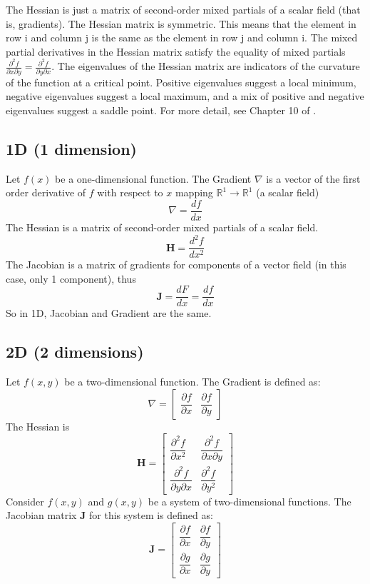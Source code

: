 \documentclass[11pt,a4paper]{book}
\theoremstyle{definition}\newtheorem{definition}{Definition}
\theoremstyle{definition}\newtheorem{fact}{Fact}
\theoremstyle{definition}\newtheorem{remark}{Remark}
\theoremstyle{definition}\newtheorem{ex}{Ex.}
\theoremstyle{definition}\newtheorem{project}{Project}
\theoremstyle{definition}\newtheorem{problem}{Problem}
\theoremstyle{definition}\newtheorem{example}{Example}
\numberwithin{theorem}{section}
\numberwithin{corollary}{chapter}
\numberwithin{assumption}{chapter}
\numberwithin{definition}{chapter}
\numberwithin{prop}{chapter}
\numberwithin{notation}{chapter}
\numberwithin{problem}{chapter}
\numberwithin{example}{chapter}
\numberwithin{fact}{chapter}
\numberwithin{ex}{chapter}
\def\R{\mathbb R}
\def\R{\mathbb R}
\def\H{\mathbf H}
\begin{document}
\begin{appendices}
	The Hessian is just a matrix of second-order mixed partials of a scalar field (that is, gradients). The Hessian matrix is symmetric. This means that the element in row 
	i and column 
	j is the same as the element in row 
	j and column 
	i.
	The mixed partial derivatives in the Hessian matrix satisfy the equality of mixed partials $\frac{\partial^2 f}{\partial x \partial y} = \frac{\partial^2 f}{\partial y\partial x}$. The eigenvalues of the Hessian matrix are indicators of the curvature of the function at a critical point. Positive eigenvalues suggest a local minimum, negative eigenvalues suggest a local maximum, and a mix of positive and negative eigenvalues suggest a saddle point. For more detail, see Chapter 10 of \citet{springcamp}.
	
	\subsection*{1D (1 dimension)}
	Let \( f(x) \) be a one-dimensional function. The Gradient \( \nabla \) is a vector of the first order derivative of \( f \) with respect to \( x \) mapping $\R^1 \to \R^1$ (a scalar field)
	\[
	\nabla = \dfrac{df}{dx}
	\]
	The Hessian is a matrix of second-order mixed partials of a scalar field.
	\[
	\mathbf{H} = \dfrac{d^2f}{dx^2}
	\]	
	The Jacobian is a matrix of gradients for components of a vector field (in this case, only 1 component), thus
	\[
	\mathbf{J} = \dfrac{dF}{dx} = \dfrac{df}{dx}
	\]	
	So in 1D, Jacobian and Gradient are the same.	
	
	\subsection*{2D (2 dimensions)}
	
	Let \( f(x, y) \) be a two-dimensional function. The Gradient is defined as:
	\[
	\nabla =
	\begin{bmatrix}
		\dfrac{\partial f}{\partial x} & \dfrac{\partial f}{\partial y}
	\end{bmatrix}
	\]
	The Hessian is 
	\[
	\H = \begin{bmatrix}
		\dfrac{\partial^2 f}{\partial x^2} & \dfrac{\partial^2 f}{\partial x \partial y} \\
		\dfrac{\partial^2 f}{\partial y \partial x} & \dfrac{\partial^2 f}{\partial y^2}
	\end{bmatrix}
	\]
	Consider \( f(x, y) \) and \( g(x, y) \) be a system of two-dimensional functions. The Jacobian matrix \( \mathbf{J} \) for this system is defined as:
	\[
	\mathbf{J} =
	\begin{bmatrix}
		\dfrac{\partial f}{\partial x} & \dfrac{\partial f}{\partial y} \\
		\dfrac{\partial g}{\partial x} & \dfrac{\partial g}{\partial y}
	\end{bmatrix}
	\]
	

\end{appendices}
\end{document}
